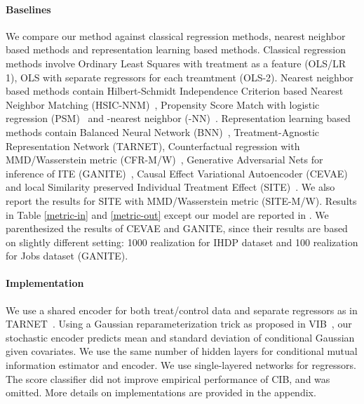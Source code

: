 \documentclass{article}
\begin{document}
\vspace{-.1cm}
    \paragraph{Baselines} We compare our method against classical regression methods, nearest neighbor based methods and representation learning based methods. Classical regression methods involve Ordinary Least Squares with treatment as a feature (OLS/LR 1), OLS with separate regressors for each treamtment (OLS-2). Nearest neighbor based methods contain Hilbert-Schmidt Independence Criterion based Nearest Neighbor Matching (HSIC-NNM)~\cite{chang2017informative}, Propensity Score Match with logistic regression (PSM)~\cite{rosenbaum1983central} and -nearest neighbor (-NN)~\cite{crump2008nonparametric}. Representation learning based methods contain Balanced Neural Network (BNN)~\cite{johansson16}, Treatment-Agnostic Representation Network (TARNET), Counterfactual regression with MMD/Wasserstein metric (CFR-M/W)~\cite{Shalit17}, Generative Adversarial Nets for inference of ITE (GANITE)~\cite{yoon2018ganite}, Causal Effect Variational Autoencoder (CEVAE)~\cite{Louizos17} and local Similarity preserved Individual Treatment Effect (SITE)~\cite{yao2018}. We also report the results for SITE with MMD/Wasserstein metric (SITE-M/W). Results in Table \ref{metric-in} and \ref{metric-out} except our model are reported in \cite{yoon2018ganite, Louizos17, yao2018}. We parenthesized the results of CEVAE and GANITE, since their results are based on slightly different setting: 1000 realization for IHDP dataset and 100 realization for Jobs dataset (GANITE).
    
    \vspace{-.1cm}
    \paragraph{Implementation} We use a shared encoder for both treat/control data and separate regressors as in TARNET~\cite{Shalit17}.  Using a Gaussian reparameterization trick as proposed in VIB~\cite{Alemi17}, our stochastic encoder predicts mean and standard deviation of conditional Gaussian given covariates. We use the same number of hidden layers for conditional mutual information estimator and encoder. We use single-layered networks for regressors. The score classifier did not improve empirical performance of CIB, and was omitted. More details on implementations are provided in the appendix. 

\vspace{-.1cm}
\end{document}
